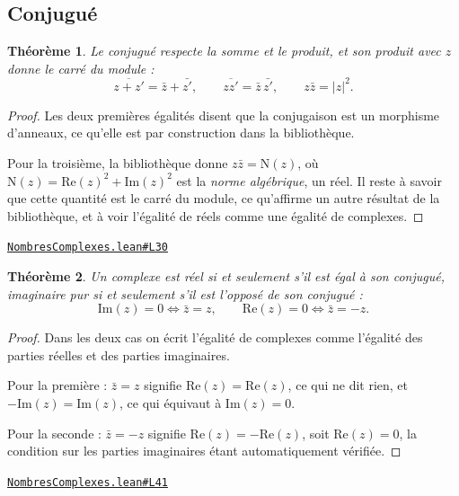 \documentclass[11pt,a4paper]{article}
\theoremstyle{definition}
\theoremstyle{plain}
\newtheorem{theoreme}{Théorème}
\newcommand{\source}[2]{\par\smallskip\noindent\hfill{\footnotesize\href{#1}{\texttt{#2}}}\par\smallskip}
\begin{document}
\subsection{Conjugué}

\begin{theoreme}
Le conjugué respecte la somme et le produit, et son produit avec $z$ donne le carré du
module :
\[ \overline{z + z'} = \bar z + \bar{z'}, \qquad
   \overline{zz'} = \bar z \,\bar{z'}, \qquad
   z \bar z = |z|^{2} . \]
\end{theoreme}

\begin{proof}
Les deux premières égalités disent que la conjugaison est un morphisme d'anneaux, ce
qu'elle est par construction dans la bibliothèque.

Pour la troisième, la bibliothèque donne $z \bar z = \mathrm{N}(z)$, où
$\mathrm{N}(z) = \mathrm{Re}(z)^{2} + \mathrm{Im}(z)^{2}$ est la \emph{norme
algébrique}, un réel. Il reste à savoir que cette quantité est le carré du module, ce
qu'affirme un autre résultat de la bibliothèque, et à voir l'égalité de réels comme une
égalité de complexes.
\end{proof}
\source{https://github.com/Commutator-IO/learn-lean/blob/main/cours/02-lycee/07-nombres-complexes/NombresComplexes.lean\#L30}{NombresComplexes.lean\#L30}

\begin{theoreme}
Un complexe est réel si et seulement s'il est égal à son conjugué, imaginaire pur si et
seulement s'il est l'opposé de son conjugué :
\[ \mathrm{Im}(z) = 0 \iff \bar z = z , \qquad
   \mathrm{Re}(z) = 0 \iff \bar z = -z . \]
\end{theoreme}

\begin{proof}
Dans les deux cas on écrit l'égalité de complexes comme l'égalité des parties réelles et
des parties imaginaires.

Pour la première : $\bar z = z$ signifie $\mathrm{Re}(z) = \mathrm{Re}(z)$, ce qui ne dit
rien, et $-\mathrm{Im}(z) = \mathrm{Im}(z)$, ce qui équivaut à $\mathrm{Im}(z) = 0$.

Pour la seconde : $\bar z = -z$ signifie $\mathrm{Re}(z) = -\mathrm{Re}(z)$, soit
$\mathrm{Re}(z) = 0$, la condition sur les parties imaginaires étant automatiquement
vérifiée.
\end{proof}
\source{https://github.com/Commutator-IO/learn-lean/blob/main/cours/02-lycee/07-nombres-complexes/NombresComplexes.lean\#L41}{NombresComplexes.lean\#L41}
\end{document}
